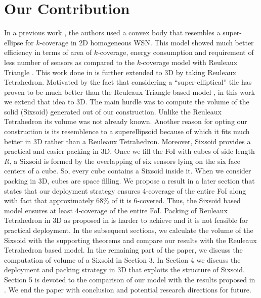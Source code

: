 \documentclass[conference]{IEEEtran}
\begin{document}
\section{Our Contribution}\label{oc}
In a previous work \cite{MS}, the authors used a convex body that resembles a super-ellipse for $k$-coverage in 2D homogeneous WSN. This model \cite{MS} showed much better efficiency in terms of area of $k$-coverage, energy consumption and requirement of less number of sensors as compared to the $k$-coverage model with Reuleaux Triangle \cite{A}. This work done in \cite{A} is further extended to 3D by taking Reuleaux Tetrahedron. Motivated by the fact that considering a ``super-elliptical'' tile has proven to be much better than the Reuleaux Triangle based model \cite{MS}, in this work we extend that idea to 3D. The main hurdle was to compute the volume of the solid 
(Sixsoid) generated out of our construction. Unlike the Reuleaux Tetrahedron its volume was not already known. Another reason for opting our construction is its resemblence to a superellipsoid because of which it fits much better in 3D rather than a Reuleaux Tetrahedron. Moreover, Sixsoid provides a practical and easier packing in 3D. Once we fill the FoI with cubes of side length $R$, a Sixsoid is formed by the overlapping of six sensors lying on the six face centers of a cube. So, every cube contains a Sixsoid inside it. When we consider packing in 3D, cubes are space filling. We propose a result in a later section that states that our deployment strategy ensures 4-coverage of the entire FoI along with fact that approximately 68\% of it is 6-covered. Thus, the Sixsoid based model ensures at least 4-coverage of the entire FoI. Packing of Reuleaux Tetrahedron in 3D as proposed in \cite{A} is harder to achieve and it is not feasible for practical deployment. 
In the subsequent sections, we calculate the volume of the Sixsoid with the supporting theorems and compare our results with the Reuleaux Tetrahedron based model. In the remaining part of the paper, we discuss the computation of volume of a Sixsoid in Section 3. In Section 4 we discuss the deployment and packing strategy in 3D that exploits the structure of Sixsoid. Section 5 is devoted to the comparison of our model with the results proposed in \cite{AD1}. We end the paper with conclusion and potential research directions for future. 
\end{document}
